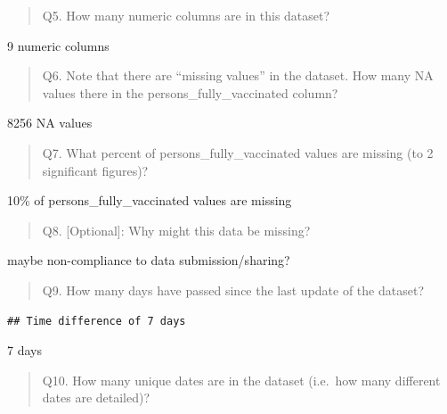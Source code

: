 \documentclass[
]{article}
\newenvironment{Shaded}{\begin{snugshade}}{\end{snugshade}}
\newcommand{\FunctionTok}[1]{\textcolor[rgb]{0.00,0.00,0.00}{#1}}
\newcommand{\NormalTok}[1]{#1}
\newcommand{\SpecialCharTok}[1]{\textcolor[rgb]{0.00,0.00,0.00}{#1}}
\begin{document}
\begin{quote}
Q5. How many numeric columns are in this dataset?
\end{quote}

9 numeric columns

\begin{quote}
Q6. Note that there are ``missing values'' in the dataset. How many NA
values there in the persons\_fully\_vaccinated column?
\end{quote}

8256 NA values

\begin{quote}
Q7. What percent of persons\_fully\_vaccinated values are missing (to 2
significant figures)?
\end{quote}

10\% of persons\_fully\_vaccinated values are missing

\begin{quote}
Q8. {[}Optional{]}: Why might this data be missing?
\end{quote}

maybe non-compliance to data submission/sharing?

\begin{quote}
Q9. How many days have passed since the last update of the dataset?
\end{quote}

\begin{Shaded}
\end{Shaded}

\begin{verbatim}
## Time difference of 7 days
\end{verbatim}

7 days

\begin{quote}
Q10. How many unique dates are in the dataset (i.e.~how many different
dates are detailed)?
\end{quote}

\begin{Shaded}
\end{Shaded}
\end{document}
